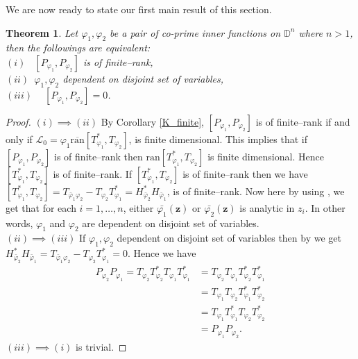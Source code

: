 \documentclass[12pt, a4 paper]{amsart}
\newcommand{\cll}{\mathcal{L}}
\newcommand{\D}{\mathbb{D}}
\theoremstyle{definition}
\theoremstyle{plain}
\newtheorem{thm}{Theorem}[section]
\theoremstyle{definition}
\newtheorem{rem}[thm]{Remark}
\numberwithin{equation}{section}
\let\phi=\varphi
\begin{document}
 We are now ready to state our first main result of this section. 
\begin{thm}\label{polyfinite}
Let $\phi_1, \phi_2$ be a pair of co-prime inner functions on $\D^n$ where $n>1$, then the followings are equivalent:\\ \vspace{1mm}
$(i)$~ $[P_{\phi_1},P_{\phi_2}]$ is of finite--rank,\\ \vspace{1mm}
$(ii)$~$\phi_1,\phi_2$ dependent on disjoint set of variables,\\ \vspace{1mm}
$(iii)$ ~ $[P_{\phi_1},P_{\phi_2}]=0$.
\end{thm}
\begin{proof}
$(i)\implies (ii)$ By Corollary \ref{K_finite}, $[P_{\phi_1},P_{\phi_2}]$ is of finite--rank if and only if $\cll_0 = \phi_1 \overline{\mbox{ran}} [T_{\phi_1}^*, T_{\phi_2}]$, is finite dimensional. This implies that if $[P_{\phi_1},P_{\phi_2}]$ is of finite--rank then ${\mbox{ran}} [T_{\phi_1}^*, T_{\phi_2}]$ is finite dimensional. Hence $[T_{\phi_1}^*, T_{\phi_2}]$ is of finite--rank. If $[T_{\phi_1}^*, T_{\phi_2}]$ is  of finite--rank then we have $[T_{\phi_1}^*, T_{\phi_2}]=T_{\bar\phi_1\phi_2}-T_{\phi_2}T^*_{\phi_1}=H^*_{\bar\phi_2}H_{\bar\phi_1}$, is of finite--rank. Now here by using \cite[Corollary 1]{Gu}, we get that for each $i=1,\ldots,n$, either $\bar{\phi_1}(\bm{z})$ or $\bar{\phi_2}(\bm{z})$ is analytic in $z_i$. In other words, $\phi_1$ and $\phi_2$ are dependent on disjoint set of variables.\\
$(ii)\implies (iii)$ If $\phi_1,\phi_2$ dependent on disjoint set of variables then by \cite[Corollary 2]{Gu} we get $H^*_{\bar\phi_2}H_{\bar\phi_1}=T_{\bar\phi_1\phi_2}-T_{\phi_2}T^*_{\phi_1}=0$. Hence we have
\begin{align*}
P_{\phi_2} P_{\phi_1} = T_{\phi_2} T_{\phi_2}^*T_{\phi_1} T_{\phi_1}^* &= T_{\phi_2} T_{\phi_1}T_{\phi_2}^* T_{\phi_1}^* \\
&= T_{\phi_1} T_{\phi_2}T_{\phi_1}^* T_{\phi_2}^*\\
&= T_{\phi_1} T_{\phi_1}^*T_{\phi_2} T_{\phi_2}^* \\
&= P_{\phi_1} P_{\phi_2}.
\end{align*}
$(iii)\implies (i)$ is trivial.
\end{proof}
 
\end{document}

